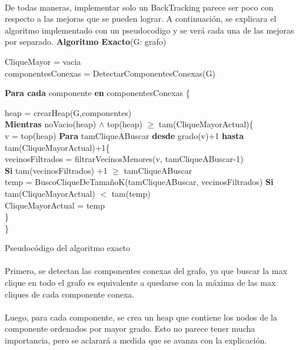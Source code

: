 \paragraph{}
De todas maneras, implementar solo un BackTracking parece ser poco con respecto a las mejoras que se pueden lograr. A continuación, 
se explicara el algoritmo implementado con un pseudocodigo y se verá cada una de las mejoras por separado.
\vspace{2em}
\incmargin{3em}
\linesnumbered
{}
\footnotesize 
\textbf{Algoritmo Exacto}(G: grafo) \\
\begin{algorithm}[H]
	\BlankLine
		CliqueMayor = vacia\\
		componentesConexas = DetectarComponentesConexas(G)
		\BlankLine

		\textbf{Para cada} componente \textbf{en} componentesConexas \{ 
		\BlankLine

		\tab\tab heap = crearHeap(G,componentes) \\

		\BlankLine
		\tab\tab \textbf{Mientras} noVacio(heap) $\wedge$ top(heap) $\geq$ tam(CliqueMayorActual)\{\\
		\BlankLine
		\tab\tab\tab v = top(heap)
		\BlankLine
		\tab\tab\tab \textbf{Para} tamCliqueABuscar \textbf{desde} grado(v)+1 \textbf{hasta} tam(CliqueMayorActual)+1\{\\
		\tab\tab\tab\tab vecinosFiltrados = 	filtrarVecinosMenores(v, tamCliqueABuscar-1)\\						
		\tab\tab\tab\tab \textbf{Si} tam(vecinosFiltrados) +1 $\geq$ tamCliqueABuscar\\ 			
		\tab\tab\tab\tab\tab temp = BuscoCliqueDeTamañoK(tamCliqueABuscar, vecinosFiltrados)
		\BlankLine
		\tab\tab\tab\tab\tab \textbf{Si}  tam(CliqueMayorActual)  $<$ tam(temp)\\ 
		\tab\tab\tab\tab\tab\tab CliqueMayorActual  = temp\\
		\tab\tab\tab\}\\
		\tab\tab\}
\caption{Pseudocódigo del algoritmo exacto}
\end{algorithm}

\normalsize

\paragraph{}
Primero, se detectan las componentes conexas del grafo, ya que buscar la max clique en todo el grafo es equivalente a quedarse con la máxima de las max cliques de cada componente conexa.

\paragraph{}
Luego, para cada componente, se crea un heap que contiene los nodos de la componente ordenados por mayor grado. Esto no parece tener mucha importancia, pero se aclarará a medida que se avanza con la explicación.

\paragraph{}




